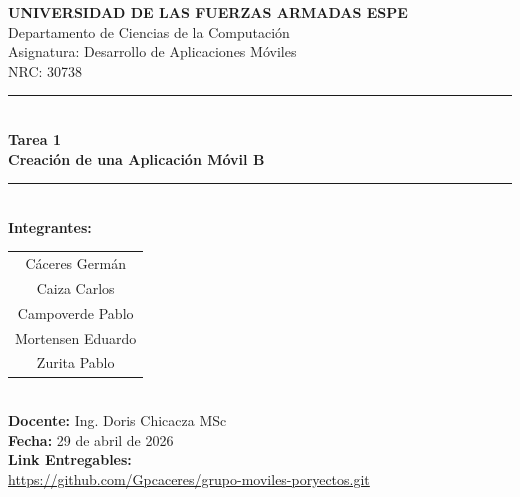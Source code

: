 \documentclass[12pt,a4paper]{article}
\begin{document}

\thispagestyle{portada}
\singlespacing
\setlength{\parskip}{0pt}
\vspace*{1.2cm}
\begin{center}
  {\Large\bfseries\color{espeblue}
    UNIVERSIDAD DE LAS FUERZAS ARMADAS ESPE\\[0.3cm]}
  {\large\color{espeblue}
    Departamento de Ciencias de la Computación\\[0.2cm]
    Asignatura: Desarrollo de Aplicaciones Móviles\\[0.2cm]
    NRC: 30738\\[0.6cm]}
  \textcolor{espeblue}{\rule{\linewidth}{1.5pt}}\\[0.4cm]
  {\LARGE\bfseries\color{espeblue}
    Tarea 1\\[0.25cm]
    Creación de una Aplicación Móvil B\\[0.35cm]}
  \textcolor{espeblue}{\rule{\linewidth}{1.5pt}}\\[1.0cm]
  {\large\bfseries Integrantes:}\\[0.4cm]
  \begin{tabular}{c}
    Cáceres Germán\\[0.15cm]
    Caiza Carlos\\[0.15cm]
    Campoverde Pablo\\[0.15cm]
    Mortensen Eduardo\\[0.15cm]
    Zurita Pablo\\
  \end{tabular}\\[1.5cm]
  {\large\textbf{Docente:} Ing. Doris Chicacza MSc}\\[0.35cm]
  {\large\textbf{Fecha:} 29 de abril de 2026}\\[0.35cm]
  
  {\large\textbf{Link Entregables:}}\\[0.35cm]
  {\large\url{https://github.com/Gpcaceres/grupo-moviles-poryectos.git}}\\[0.35cm]
\end{center}

\newpage
{}

\tableofcontents
\end{document}
